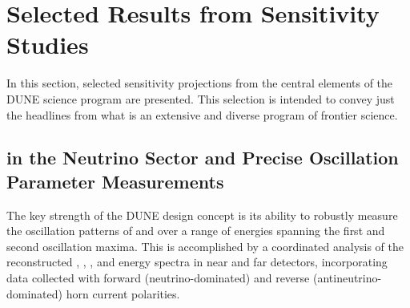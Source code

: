 \section{Selected Results from Sensitivity Studies}
\label{sec:exec-phys-sensitiv-results}

In this section, selected sensitivity projections from the 
central elements of the DUNE science program are presented.  
This selection is intended to convey just the headlines from 
what is an extensive and diverse program of frontier science.

\subsection{ in the Neutrino 
Sector and Precise Oscillation Parameter Measurements}

The key strength of the DUNE design concept is its ability to 
robustly measure the oscillation patterns of \numu and \anumu 
over a range of energies spanning the first and second 
oscillation maxima. 
This is accomplished by a coordinated analysis of the 
reconstructed \numu, \anumu, \nue, and \anue energy spectra 
in near and far detectors, 
incorporating data collected with forward (neutrino-dominated) 
and reverse (antineutrino-dominated) horn current polarities.  

